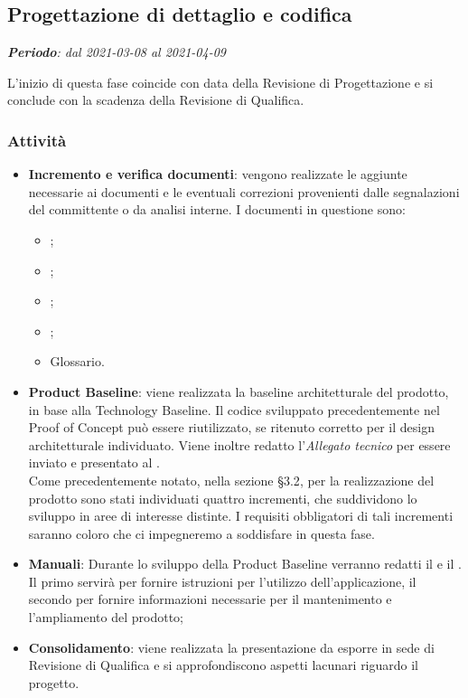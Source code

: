 \subsection{Progettazione di dettaglio e codifica}
\textit{\textbf{Periodo}: dal 2021-03-08 al 2021-04-09}

L'inizio di questa fase coincide con data della Revisione di Progettazione e si conclude con la scadenza della Revisione di Qualifica.

\subsubsection{Attività}

\begin{itemize}
\item \textbf{Incremento e verifica documenti}: vengono realizzate le aggiunte necessarie ai documenti e le eventuali correzioni provenienti dalle segnalazioni del committente o da analisi interne. I documenti in questione sono:
\begin{itemize}
\item \NdP{};
\item \AdR{};
\item \PdQ{};
\item \PdP{};
\item Glossario.
\end{itemize}
\item \textbf{Product Baseline}: viene realizzata la baseline architetturale del prodotto, in base alla Technology Baseline. Il codice sviluppato precedentemente nel Proof of Concept può essere riutilizzato, se ritenuto corretto per il design architetturale individuato. Viene inoltre redatto l'\textit{Allegato tecnico} per essere inviato e presentato al \CR{}.\\ Come precedentemente notato, nella sezione \S{3.2}, per la realizzazione del prodotto sono stati individuati quattro incrementi, che suddividono lo sviluppo in aree di interesse distinte. I requisiti obbligatori di tali incrementi saranno coloro che ci impegneremo a soddisfare in questa fase.
\item \textbf{Manuali}: Durante lo sviluppo della Product Baseline verranno redatti il \MU{} e il \MM. Il primo servirà per fornire istruzioni per l'utilizzo dell'applicazione, il secondo per fornire informazioni necessarie per il mantenimento e l'ampliamento del prodotto;
\item \textbf{Consolidamento}: viene realizzata la presentazione da esporre in sede di Revisione di Qualifica e si approfondiscono aspetti lacunari riguardo il progetto.
\end{itemize}


